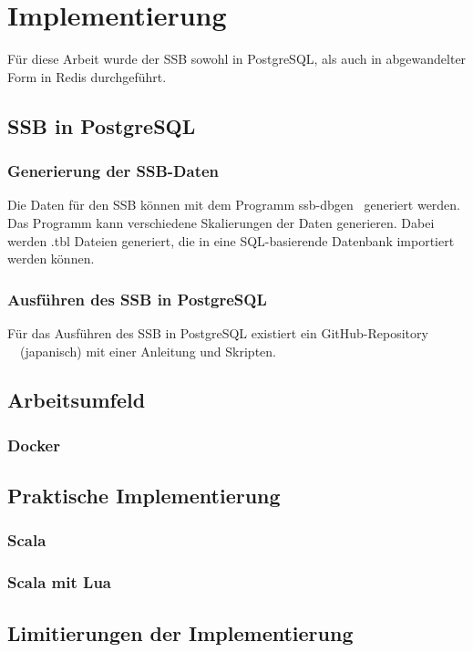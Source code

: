 \chapter{Implementierung}
Für diese Arbeit wurde der \acl{SSB} sowohl in PostgreSQL, als auch in abgewandelter Form in Redis durchgeführt.
\section{\acl{SSB} in PostgreSQL}
\subsection{Generierung der \acs{SSB}-Daten}
Die Daten für den \acl{SSB} können mit dem Programm ssb-dbgen~\cite{phillips_electrumssb-dbgen_2023} generiert werden.
Das Programm kann verschiedene Skalierungen der Daten generieren.
Dabei werden .tbl Dateien generiert, die in eine SQL-basierende Datenbank importiert werden können.
\subsection{Ausführen des \acl{SSB} in PostgreSQL}

Für das Ausführen des \ac{SSB} in PostgreSQL existiert ein GitHub-Repository ~\cite{nukoyokohama_ssb-postgres_2023}~(japanisch) mit einer Anleitung und Skripten.


\section{Arbeitsumfeld}

\subsection{Docker}


\section{Praktische Implementierung}

\subsection{Scala}

\subsection{Scala mit Lua}

\section{Limitierungen der Implementierung}
